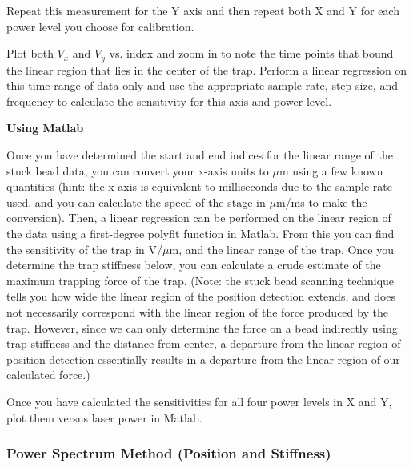 \documentclass{../lab}
\begin{document}
Repeat this measurement for the Y axis and then repeat both X and Y for each power level you choose for calibration.

Plot both $V_x$ and $V_y$ vs. index and zoom in to note the time points that bound the linear region that lies in the center of the trap. Perform a linear regression on this time range of data only and use the appropriate sample rate, step size, and frequency to calculate the sensitivity for this axis and power level.

\textbf{Using Matlab}

Once you have determined the start and end indices for the linear range of the stuck bead data, you can convert your x-axis units to $\mu$m using a few known quantities (hint: the x-axis is equivalent to milliseconds due to the sample rate used, and you can calculate the speed of the stage in $\mu$m/ms to make the conversion). Then, a linear regression can be performed on the linear region of the data using a first-degree polyfit function in Matlab. From this you can find the sensitivity of the trap in V/$\mu$m, and the linear range of the trap. Once you determine the trap stiffness below, you can calculate a crude estimate of the maximum trapping force of the trap. (Note: the stuck bead scanning technique tells you how wide the linear region of the position detection extends, and does not necessarily correspond with the linear region of the force produced by the trap. However, since we can only determine the force on a bead indirectly using trap stiffness and the distance from center, a departure from the linear region of position detection essentially results in a departure from the linear region of our calculated force.)

Once you have calculated the sensitivities for all four power levels in X and Y, plot them versus laser power in Matlab.



\subsubsection{Power Spectrum Method (Position and Stiffness)}
\end{document}
